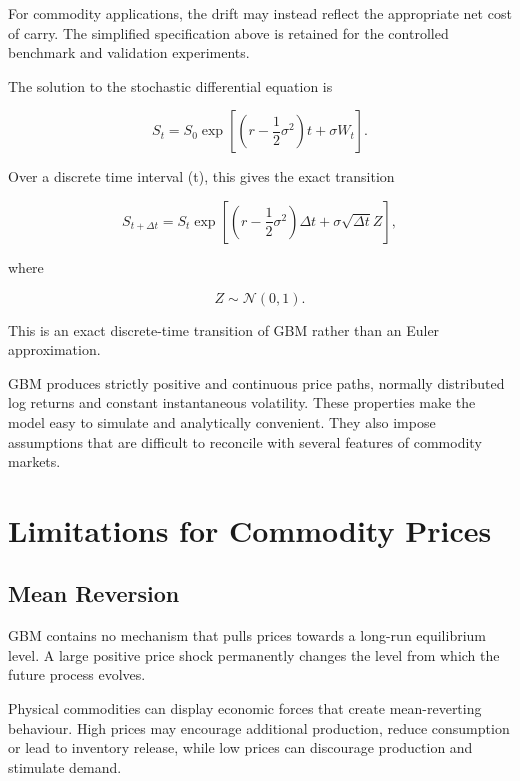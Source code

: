 \documentclass[12pt,a4paper]{report}
\begin{document}
For commodity applications, the drift may instead reflect the appropriate net cost of carry. The simplified specification above is retained for the controlled benchmark and validation experiments.

The solution to the stochastic differential equation is

\begin{equation}
S_t
=
S_0
\exp
\left[
\left(
r-\frac{1}{2}\sigma^2
\right)t
+
\sigma W_t
\right].
\end{equation}

Over a discrete time interval (\Delta t), this gives the exact transition

\begin{equation}
S_{t+\Delta t}
=
S_t
\exp
\left[
\left(
r-\frac{1}{2}\sigma^2
\right)\Delta t
+
\sigma\sqrt{\Delta t}Z
\right],
\end{equation}

where

\begin{equation}
Z\sim\mathcal{N}(0,1).
\end{equation}

This is an exact discrete-time transition of GBM rather than an Euler approximation.

GBM produces strictly positive and continuous price paths, normally distributed log returns and constant instantaneous volatility. These properties make the model easy to simulate and analytically convenient. They also impose assumptions that are difficult to reconcile with several features of commodity markets.

\section{Limitations for Commodity Prices}

\subsection{Mean Reversion}

GBM contains no mechanism that pulls prices towards a long-run equilibrium level. A large positive price shock permanently changes the level from which the future process evolves.

Physical commodities can display economic forces that create mean-reverting behaviour. High prices may encourage additional production, reduce consumption or lead to inventory release, while low prices can discourage production and stimulate demand.
\end{document}
